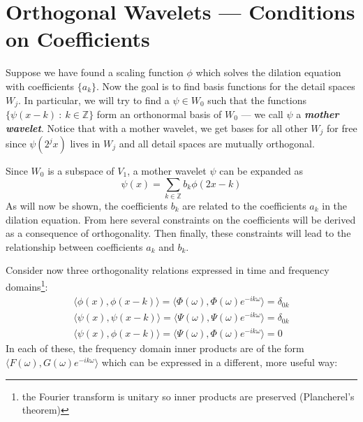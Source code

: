 \documentclass[onecolumn]{gwclass}
\begin{document}
\section{Orthogonal Wavelets --- Conditions on Coefficients}

Suppose we have found a scaling function $\phi$ which solves the dilation equation with coefficients $\{a_k\}$. Now the goal is to find basis functions for the detail spaces $W_j$. In particular, we will try to find a $\psi \in W_0$ such that the functions $\{\psi(x - k) \::\:k\in\mathbb{Z}\}$ form an orthonormal basis of $W_0$ --- we call $\psi$ a \textbf{\emph{mother wavelet}}. Notice that with a mother wavelet, we get bases for all other $W_j$ for free since $\psi(2^jx)$ lives in $W_j$ and all detail spaces are mutually orthogonal.

Since $W_0$ is a subspace of $V_1$, a mother wavelet $\psi$ can be expanded as 
$$ \psi(x) = \sum_{k\in\mathbb{Z}}b_k \phi(2x - k) $$
As will now be shown, the coefficients $b_k$ are related to the coefficients $a_k$ in the dilation equation. From here several constraints on the coefficients will be derived as a consequence of orthogonality. Then finally, these constraints will lead to the relationship between coefficients $a_k$ and $b_k$.

Consider now three orthogonality relations expressed in time and frequency domains\footnote{the Fourier transform is unitary so inner products are preserved (Plancherel's theorem)}:
\begin{align*}
	\textstyle{\langle \phi(x), \phi(x-k) \rangle =\langle \Phi(\omega), \Phi(\omega)e^{-ik\omega}\rangle = \delta_{0k}} \\
	\textstyle{\langle \psi(x), \psi(x-k)\rangle= \langle \Psi(\omega), \Psi(\omega)e^{-ik\omega}\rangle = \delta_{0k}} \\
	\textstyle{\langle \psi(x), \phi(x-k)\rangle = \langle\Psi(\omega), \Phi(\omega)e^{-ik\omega}\rangle = 0}
\end{align*}
In each of these, the frequency domain inner products are of the form $\langle F(\omega), G(\omega)e^{-ik\omega}\rangle$ which can be expressed in a different, more useful way:
\end{document}
